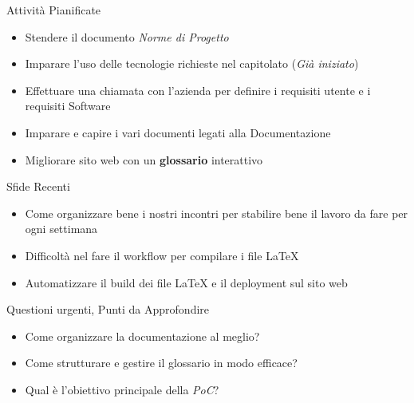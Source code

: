 \documentclass{beamer}
\begin{document}
\begin{frame}
    \begin{block}{Attività Pianificate}
        \begin{itemize}
            \item Stendere il documento \emph{Norme di Progetto} 
            \item Imparare l'uso delle tecnologie richieste nel capitolato (\textit{Già iniziato})
            \item Effettuare una chiamata con l'azienda per definire i requisiti utente e i requisiti Software
            \item Imparare e capire i vari documenti legati alla Documentazione
            \item Migliorare sito web con un \textbf{glossario} interattivo
        \end{itemize}
    \end{block}
\end{frame}

\begin{frame}
    \begin{alertblock}{Sfide Recenti}
        \begin{itemize}
            \item Come organizzare bene i nostri incontri per stabilire bene il lavoro da fare per ogni settimana
            \item Difficoltà nel fare il workflow per compilare i file LaTeX
            \item Automatizzare il build dei file LaTeX e il deployment sul sito web 
        \end{itemize}
    \end{alertblock}
\end{frame}

\begin{frame}
    \begin{block}{Questioni urgenti, Punti da Approfondire}
        \begin{itemize}
            \item Come organizzare la documentazione al meglio?
            \item Come strutturare e gestire il glossario in modo efficace?
            \item Qual è l'obiettivo principale della \emph{PoC}?
        \end{itemize}
    \end{block}
\end{frame}
\end{document}
